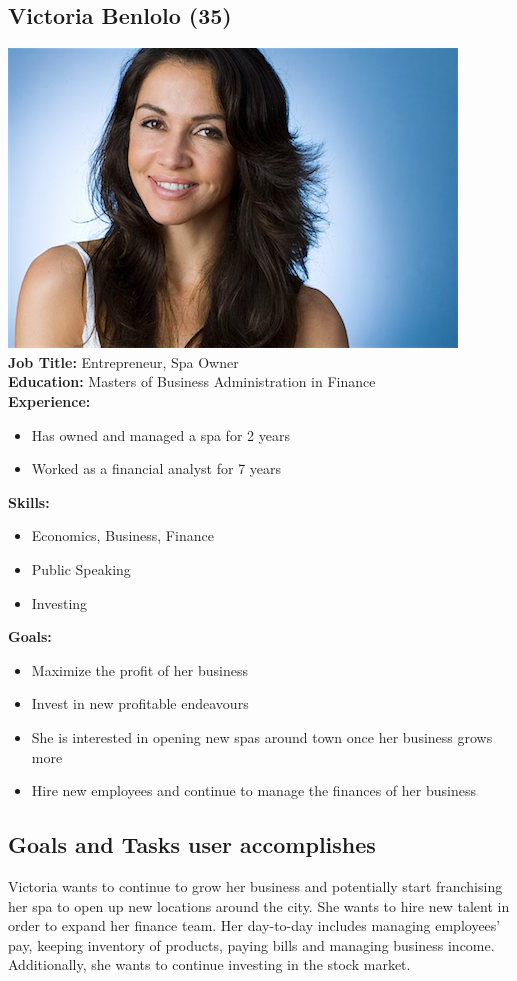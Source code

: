 \documentclass{article}
\begin{document}
\subsection*{Victoria Benlolo (35)}
\includegraphics[scale=0.4]{victoria.jpg}\\
\textbf{Job Title: } Entrepreneur, Spa Owner \\
\textbf{Education:} Masters of Business Administration in Finance\\
\textbf{Experience:}
\begin{itemize}
\itemsep0em 
\item Has owned and managed a spa for 2 years
\item Worked as a financial analyst for 7 years
\end{itemize}

\textbf{Skills:}
\begin{itemize}
\itemsep0em 
\item Economics, Business, Finance
\item Public Speaking
\item Investing
\end{itemize}

\textbf{Goals:}
\begin{itemize}
\itemsep0em 
\item Maximize the profit of her business
\item Invest in new profitable endeavours 
\item She is interested in opening new spas around town once her business grows more
\item Hire new employees and continue to manage the finances of her business
\end{itemize}

\subsection*{Goals and Tasks user accomplishes}
Victoria wants to continue to grow her business and potentially start franchising her spa to open up new locations around the city. She wants to hire new talent in order to expand her finance team. Her day-to-day includes managing employees' pay, keeping inventory of products, paying bills and managing business income. Additionally, she wants to continue investing in the stock market.  
\end{document}
